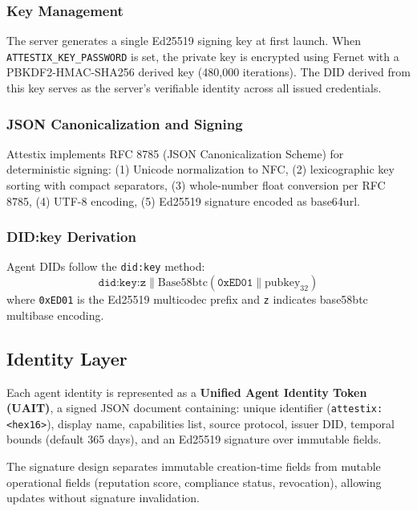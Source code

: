 \documentclass[conference]{IEEEtran}
\begin{document}
\subsubsection{Key Management}

The server generates a single Ed25519 signing key at first launch. When \texttt{ATTESTIX\_KEY\_PASSWORD} is set, the private key is encrypted using Fernet with a PBKDF2-HMAC-SHA256 derived key (480,000 iterations). The DID derived from this key serves as the server's verifiable identity across all issued credentials.

\subsubsection{JSON Canonicalization and Signing}

Attestix implements RFC 8785 (JSON Canonicalization Scheme) for deterministic signing: (1) Unicode normalization to NFC, (2) lexicographic key sorting with compact separators, (3) whole-number float conversion per RFC 8785, (4) UTF-8 encoding, (5) Ed25519 signature encoded as base64url.

\subsubsection{DID:key Derivation}

Agent DIDs follow the \texttt{did:key} method:
\begin{equation}
\texttt{did:key:z} \| \text{Base58btc}(\texttt{0xED01} \| \text{pubkey}_{32})
\end{equation}
where \texttt{0xED01} is the Ed25519 multicodec prefix and \texttt{z} indicates base58btc multibase encoding.

\subsection{Identity Layer}

Each agent identity is represented as a \textbf{Unified Agent Identity Token (UAIT)}, a signed JSON document containing: unique identifier (\texttt{attestix:<hex16>}), display name, capabilities list, source protocol, issuer DID, temporal bounds (default 365 days), and an Ed25519 signature over immutable fields.

The signature design separates immutable creation-time fields from mutable operational fields (reputation score, compliance status, revocation), allowing updates without signature invalidation.
\end{document}

